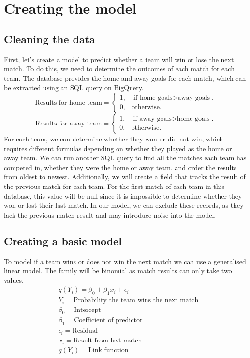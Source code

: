 \documentclass{article}
\begin{document}
\section{Creating the model}\label{sec:further}
\subsection{Cleaning the data}
First, let’s create a model to predict whether a team will win or lose the next match. To do this, we need to determine the outcomes of each match for each team. The database provides the home and away goals for each match, which can be extracted using an SQL query on BigQuery.\\
\begin{equation*}
  \text{Results for home team}=\begin{cases}
    1, & \text{if home goals$>$away goals}.\\
    0, & \text{otherwise}.
  \end{cases}
\end{equation*}
\begin{equation*}
  \text{Results for away team}=\begin{cases}
    1, & \text{if away goals$>$home goals}.\\
    0, & \text{otherwise}.
  \end{cases}
\end{equation*}
For each team, we can determine whether they won or did not win, which requires different formulas depending on whether they played as the home or away team. We can run another SQL query to find all the matches each team has competed in, whether they were the home or away team, and order the results from oldest to newest. \newline
\newline
Additionally, we will create a field that tracks the result of the previous match for each team. For the first match of each team in this database, this value will be null since it is impossible to determine whether they won or lost their last match. In our model, we can exclude these records, as they lack the previous match result and may introduce noise into the model.
\subsection{Creating a basic model}
To model if a team wins or does not win the next match we can use a generalised linear model. The family will be binomial as match results can only take two values.
\begin{align*}
    &g(Y_i)=\beta_0+\beta_1x_i+\epsilon_i\\
    &Y_i=\text{Probability the team wins the next match}\\
    &\beta_0=\text{Intercept}\\
    &\beta_1=\text{Coefficient of predictor}\\
    &\epsilon_i=\text{Residual}\\
    &x_i=\text{Result from last match} \\
    &g(Y_i)=\text{Link function}
\end{align*}
\end{document}
